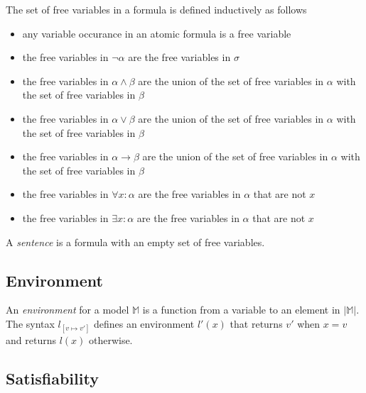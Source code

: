 		The set of free variables in a formula is defined inductively as follows
		\begin{itemize}
		\item any variable occurance in an atomic formula is a free variable
		\item the free variables in $\neg\alpha$ are the free variables in $\sigma$
		\item the free variables in $\alpha \wedge \beta$ are the union of the set of free variables in $\alpha$ with the set of free variables in $\beta$
		\item the free variables in $\alpha \vee   \beta$ are the union of the set of free variables in $\alpha$ with the set of free variables in $\beta$
		\item the free variables in $\alpha \to    \beta$ are the union of the set of free variables in $\alpha$ with the set of free variables in $\beta$
		\item the free variables in $\forall x : \alpha$ are the free variables in $\alpha$ that are not $x$
		\item the free variables in $\exists x : \alpha$ are the free variables in $\alpha$ that are not $x$
		\end{itemize}
		A \emph{sentence} is a formula with an empty set of free variables.

	\subsection{Environment}

		An \emph{environment} for a model $\mathbb{M}$ is a function from a
		variable to an element in $|\mathbb{M}|$. The syntax $l_{[v \mapsto
		v']}$ defines an environment $l'(x)$ that returns $v'$ when $x=v$ and
		returns $l(x)$ otherwise.

	\subsection{Satisfiability}

